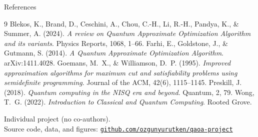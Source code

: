 \documentclass[aspectratio=169,10pt]{beamer}
\begin{document}
\begin{frame}{References}
  \footnotesize
  \begin{thebibliography}{9}
      Blekos, K., Brand, D., Ceschini, A., Chou, C.-H., Li, R.-H.,
      Pandya, K., \& Summer, A. (2024).
      \emph{A review on Quantum Approximate Optimization Algorithm
      and its variants}.
      Physics Reports, 1068, 1--66.
      Farhi, E., Goldstone, J., \& Gutmann, S. (2014).
      \emph{A Quantum Approximate Optimization Algorithm}.
      arXiv:1411.4028.
      Goemans, M.~X., \& Williamson, D.~P. (1995).
      \emph{Improved approximation algorithms for maximum cut and
      satisfiability problems using semidefinite programming}.
      Journal of the ACM, 42(6), 1115--1145.
      Preskill, J. (2018).
      \emph{Quantum computing in the NISQ era and beyond}.
      Quantum, 2, 79.
      Wong, T.~G. (2022). \emph{Introduction to Classical and Quantum
      Computing}. Rooted Grove.
  \end{thebibliography}
  \vfill
  \scriptsize\color{gray}
  Individual project (no co-authors).\\
  Source code, data, and figures:
  \href{https://github.com/ozgunyurutken/qaoa-project}%
       {\color{qaoablue}\texttt{github.com/ozgunyurutken/qaoa-project}}
\end{frame}
\end{document}

